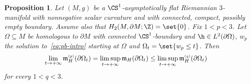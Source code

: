 \documentclass[10pt,a4paper]{amsart}
\numberwithin{equation}{section}
\newtheorem{Proposition}[Theorem]{Proposition}
\newcommand{\ma}{\mathfrak{m}}
\newcommand{\tp}[1][p]{{\text{\tiny$(#1)$}}}
\begin{document}
\begin{Proposition}\label{thm:asymptotic_behaviour_phawking}
 Let $(M,g)$ be a $\CS^1$-asymptotically flat Riemannian $3$-manifold with nonnegative scalar curvature and with connected, compact, possibly empty boundary. Assume also that $H_2(M, \partial M; \Z)= \set{0}$. Fix $1<p<3$. Let $\Omega\subseteq M$ be homologous to $\partial M$ with connected $\CS^1$-boundary and $\h \in L^2(\partial \Omega)$, $w_p$ the solution to~\eqref{eq:pb-intro} starting at $\Omega$ and $\Omega_t= \set{w_p \leq t}$. Then%
 \begin{equation}
 \label{eq:hawkingpq}
 \lim_{t \to +\infty }\ma^{\tp}_H(\partial \Omega_t)=\limsup_{t \to +\infty} \ma_H(\partial \Omega_t) \leq \limsup_{t \to +\infty} \ma_H^{\tp[q]}(\partial \Omega_t)
 \end{equation}
 for every $1<q<3$.
\end{Proposition}
\end{document}
